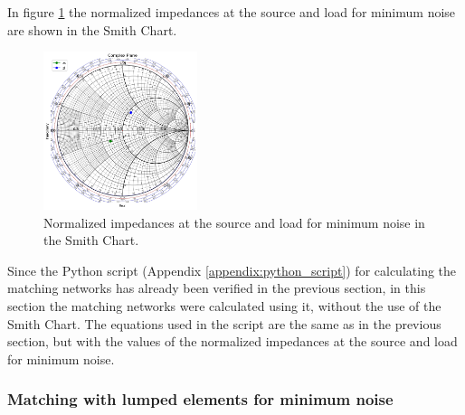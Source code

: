 In figure \ref{fig:ZsZl-noise} the normalized impedances at the source and load for minimum noise are shown in the Smith Chart.

\begin{figure}[H]
    \centering
    \includegraphics[width=0.4\textwidth]{Images/ZsZl-noise-smithChart.png}
    \caption{Normalized impedances at the source and load for minimum noise in the Smith Chart.}
    \label{fig:ZsZl-noise}
\end{figure}

Since the Python script (Appendix \ref{appendix:python_script}) for calculating the matching networks has already been verified in the previous section, in this section the matching networks were calculated using it, without the use of the Smith Chart. The equations used in the script are the same as in the previous section, but with the values of the normalized impedances at the source and load for minimum noise.

\subsubsection{Matching with lumped elements for minimum noise}

